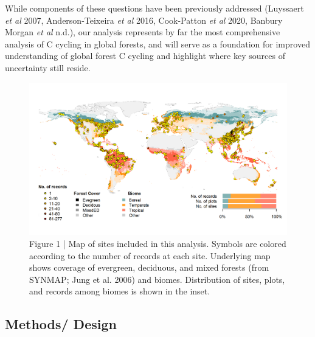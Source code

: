 \documentclass[
]{article}
\begin{document}
While components of these questions have been previously addressed
(Luyssaert \emph{et al} 2007, Anderson-Teixeira \emph{et al} 2016,
Cook-Patton \emph{et al} 2020, Banbury Morgan \emph{et al} n.d.), our
analysis represents by far the most comprehensive analysis of C cycling
in global forests, and will serve as a foundation for improved
understanding of global forest C cycling and highlight where key sources
of uncertainty still reside.

\begin{figure}[H]

{\centering \includegraphics[width=1\linewidth]{tables_figures/World_Map_records_in_Biomes} 

}

\caption{Figure 1 | Map of sites included in this analysis. Symbols are colored according to the number of records at each site. Underlying map shows coverage of evergreen, deciduous, and mixed forests (from SYNMAP; Jung et al. 2006) and biomes. Distribution of sites, plots, and records among biomes is shown in the inset.}\label{fig:unnamed-chunk-5}
\end{figure}

\hypertarget{methods-design}{%
\subsection{Methods/ Design}\label{methods-design}}
\end{document}
